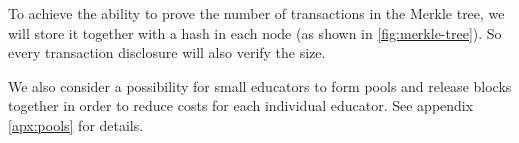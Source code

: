 To achieve the ability to prove the number of transactions in the Merkle tree,
we will store it together with a hash in each node (as shown in
\ref{fig:merkle-tree}). So every transaction disclosure will also verify the size.

We also consider a possibility for small educators to form pools and release
blocks together in order to reduce costs for each individual educator. See
appendix \ref{apx:pools} for details.
